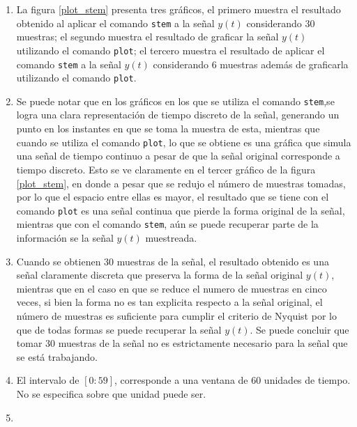 \begin{enumerate}

    \item La figura  \ref{plot_stem} presenta tres gráficos, el primero muestra el resultado obtenido al aplicar el comando \texttt{stem} a la señal $y(t)$ considerando 30 muestras; el segundo muestra el resultado de graficar la señal $y(t)$ utilizando el comando \texttt{plot};  el tercero muestra el resultado de aplicar el comando \texttt{stem} a la señal $y(t)$ considerando 6 muestras además de graficarla utilizando el comando \texttt{plot}.
    
    \item Se puede notar que en los gráficos en los que se utiliza el comando \texttt{stem},se logra una clara representación de tiempo discreto de la señal, generando un punto en los instantes en que se toma la muestra de esta, mientras que cuando se utiliza el comando \texttt{plot}, lo que se obtiene es una gráfica que simula una señal de tiempo continuo a pesar de que la señal original corresponde a tiempo discreto. Esto se ve claramente en el tercer gráfico de la figura \ref{plot_stem}, en donde a pesar que se redujo el número de muestras tomadas, por lo que el espacio entre ellas es mayor, el resultado que se tiene  con el comando \texttt{plot} es una señal continua  que pierde la forma original de la señal, mientras que con el comando \texttt{stem}, aún se puede recuperar parte de la información se la señal $y(t)$ muestreada.
    
    \item Cuando se obtienen 30 muestras de la señal, el resultado obtenido es una señal claramente discreta que preserva la forma de la señal original $y(t)$, mientras que en el caso en que se reduce el numero de muestras en cinco veces, si bien la forma no es tan explicita respecto a la señal original, el número de muestras es suficiente para cumplir el criterio de Nyquist por lo que de todas formas se puede recuperar la señal $y(t)$. Se puede concluir que tomar 30 muestras de la señal no es estrictamente necesario para la señal que se está trabajando.
    
    \item El intervalo de $[0:59]$, corresponde a una ventana de 60 unidades de tiempo. No se especifica sobre que unidad puede ser. %
    
    \item 
    

\end{enumerate}
